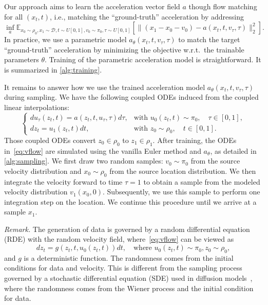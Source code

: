 Our approach aims to learn the acceleration vector field $a$ though flow matching for all $(x_t, t)$, i.e., matching the ``ground-truth'' acceleration by addressing 
\begin{equation}
\label{eq:opt}
\inf_a \mathbb{E}_{x_0\sim\rho_0,x_1\sim \mathcal{D},t\sim U[0,1],v_0\sim\pi_0,\tau\sim U[0,1]}\left[\|(x_1 - x_0 - v_0) - a(x_t,t,v_\tau, \tau)\|^2_2\right].
\end{equation}
In practice, we use a parametric model $a_\theta(x_t, t, v_\tau, \tau)$ to match the target ``ground-truth'' acceleration by minimizing the objective w.r.t.\ the trainable parameters $\theta$. Training of the parametric acceleration model is straightforward. It is summarized in \cref{alg:training}.

It remains to answer how we use the trained acceleration model $a_\theta(x_t,t,v_\tau,\tau)$ during sampling. We have the following coupled ODEs induced from the coupled linear interpolations:
\begin{equation}
\label{eq:vflow}
\begin{cases}
   du_\tau(z_t, t) = a (z_t, t, u_\tau, \tau) d\tau, & \text{with } u_0(z_t, t) \sim \pi_0, \quad \tau \in [0, 1],  \\
   dz_t = u_1(z_t, t) dt, & \text{with } z_0 \sim \rho_0, \quad t \in [0, 1].
\end{cases}
\end{equation}
Those coupled ODEs convert $z_0 \in \rho_0$ to $z_1 \in \rho_1$. After training, the ODEs in~\cref{eq:vflow} are simulated using the vanilla Euler method and $a_\theta$, as detailed in \cref{alg:sampling}. We first draw two random samples: $v_0\sim\pi_0$ from the source velocity distribution and $x_0\sim\rho_0$ from the source location distribution. We then integrate the velocity forward to time $\tau=1$ to obtain a sample from the modeled velocity distribution $v_1(x_0,0)$. Subsequently, we use this sample to perform one integration step on the location. We continue this procedure until we arrive at a sample $x_1$. 

\textit{Remark.}
The generation of data is governed by a random differential equation (RDE) with the random velocity field, where~\cref{eq:vflow} can be viewed as
\begin{equation}
    \label{eq:rde}
    dz_t = g(z_t, t, u_0(z_t, t)) dt, \quad \text{where } u_0(z_t, t) \sim \pi_0, z_0 \sim \rho_0,  
\end{equation}
and $g$ is a deterministic function. The randomness comes from the initial conditions for data and velocity. This is different from the sampling process governed by a stochastic differential equation (SDE) used in diffusion models~\citep{SongICLR2021}, where the randomness comes from the Wiener process and the initial condition for data.   

